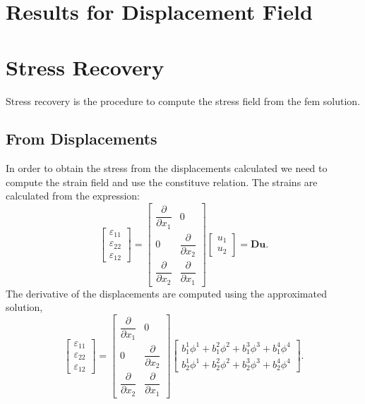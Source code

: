 \documentclass[11pt, a4paper]{article}
\numberwithin{equation}{section}
\begin{document}
\section{Results for Displacement Field}




\section{Stress Recovery}

Stress recovery is the procedure to compute the stress field from the fem solution.

\subsection{From Displacements}

In order to obtain the stress from the displacements calculated we need to compute the strain field and use the constituve relation. The strains are calculated from the expression:
\begin{equation}
\begin{bmatrix}
\varepsilon_{11} \\
\varepsilon_{22} \\
\varepsilon_{12}
\end{bmatrix} 
= 
\begin{bmatrix}
\dfrac{\partial}{\partial x_1}  & 0 \\
0 &\dfrac{\partial}{\partial x_2} \\[0.4cm]
\dfrac{\partial}{\partial x_2}  &  \dfrac{\partial}{\partial x_1} 
\end{bmatrix}
\begin{bmatrix}
u_1 \\
u_2
\end{bmatrix}
=\mathbf{Du}.
\end{equation}
The derivative of the displacements are computed using the approximated solution,
\begin{equation}
\begin{bmatrix}
\varepsilon_{11}\\
\varepsilon_{22}\\
\varepsilon_{12}
\end{bmatrix} 
=
\begin{bmatrix}
\dfrac{\partial}{\partial x_1}  & 0 \\
0 &\dfrac{\partial}{\partial x_2} \\[0.4cm]
\dfrac{\partial}{\partial x_2}  &  \dfrac{\partial}{\partial x_1} 
\end{bmatrix}
\begin{bmatrix}
b_1^1 \phi^1 + b_1^2 \phi^2 + b_1^3 \phi^3 + b^4_1 \phi^4 \\
b_2^1 \phi^1 + b_2^2 \phi^2 + b_2^3 \phi^3 + b^4_2 \phi^4
\end{bmatrix}.
\end{equation}
\end{document}
